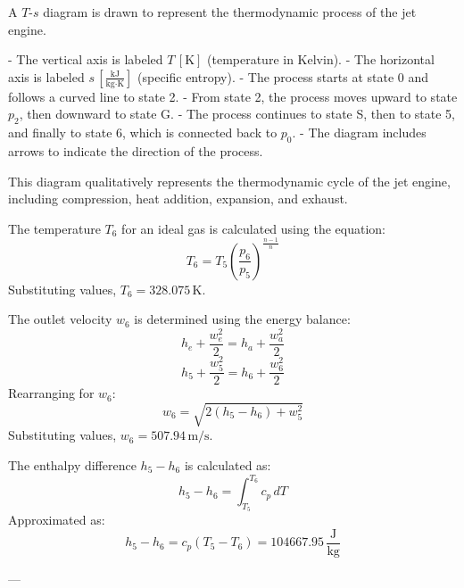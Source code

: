 A \( T \)-\( s \) diagram is drawn to represent the thermodynamic process of the jet engine.  

- The vertical axis is labeled \( T \, [\text{K}] \) (temperature in Kelvin).  
- The horizontal axis is labeled \( s \, [\frac{\text{kJ}}{\text{kg·K}}] \) (specific entropy).  
- The process starts at state 0 and follows a curved line to state 2.  
- From state 2, the process moves upward to state \( p_2 \), then downward to state G.  
- The process continues to state S, then to state 5, and finally to state 6, which is connected back to \( p_0 \).  
- The diagram includes arrows to indicate the direction of the process.  

This diagram qualitatively represents the thermodynamic cycle of the jet engine, including compression, heat addition, expansion, and exhaust.

The temperature \( T_6 \) for an ideal gas is calculated using the equation:  
\[
T_6 = T_5 \left( \frac{p_6}{p_5} \right)^{\frac{n-1}{n}}
\]  
Substituting values, \( T_6 = 328.075 \, \text{K} \).

The outlet velocity \( w_6 \) is determined using the energy balance:  
\[
h_e + \frac{w_e^2}{2} = h_a + \frac{w_a^2}{2}
\]  
\[
h_5 + \frac{w_5^2}{2} = h_6 + \frac{w_6^2}{2}
\]  
Rearranging for \( w_6 \):  
\[
w_6 = \sqrt{2(h_5 - h_6) + w_5^2}
\]  
Substituting values, \( w_6 = 507.94 \, \text{m/s} \).

The enthalpy difference \( h_5 - h_6 \) is calculated as:  
\[
h_5 - h_6 = \int_{T_5}^{T_6} c_p \, dT
\]  
Approximated as:  
\[
h_5 - h_6 = c_p (T_5 - T_6) = 104667.95 \, \frac{\text{J}}{\text{kg}}
\]

---